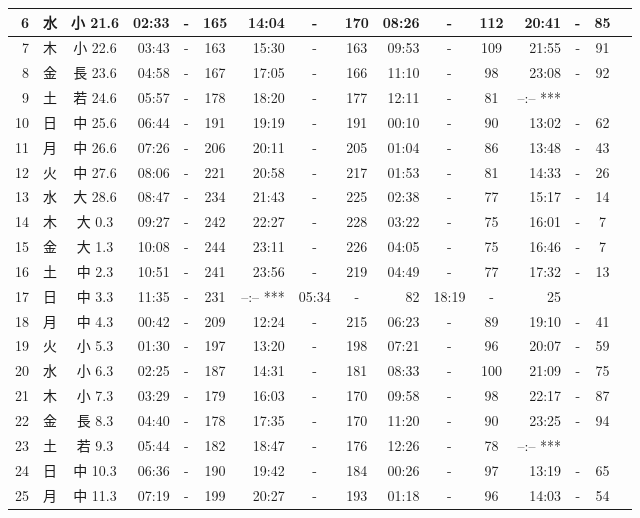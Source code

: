\documentclass[12pt.a4j]{jsarticle}
\begin{document}
\begin{center}
\begin{table}[ht]
\begin{tabular}{|rc|cr|ccrccr|ccrccr|}
\hline
 6 & 水 & 小 21.6 & 02:33 &-& 165 & 14:04 &-& 170 & 08:26 &-& 112 & 20:41 &-&  85 \\
\hline
 7 & 木 & 小 22.6 & 03:43 &-& 163 & 15:30 &-& 163 & 09:53 &-& 109 & 21:55 &-&  91 \\
\hline
 8 & 金 & 長 23.6 & 04:58 &-& 167 & 17:05 &-& 166 & 11:10 &-&  98 & 23:08 &-&  92 \\
\hline
 9 & 土 & 若 24.6 & 05:57 &-& 178 & 18:20 &-& 177 & 12:11 &-&  81 & --:--   *** \\
\hline
10 & 日 & 中 25.6 & 06:44 &-& 191 & 19:19 &-& 191 & 00:10 &-&  90 & 13:02 &-&  62 \\
\hline
11 & 月 & 中 26.6 & 07:26 &-& 206 & 20:11 &-& 205 & 01:04 &-&  86 & 13:48 &-&  43 \\
\hline
12 & 火 & 中 27.6 & 08:06 &-& 221 & 20:58 &-& 217 & 01:53 &-&  81 & 14:33 &-&  26 \\
\hline
13 & 水 & 大 28.6 & 08:47 &-& 234 & 21:43 &-& 225 & 02:38 &-&  77 & 15:17 &-&  14 \\
\hline
14 & 木 & 大  0.3 & 09:27 &-& 242 & 22:27 &-& 228 & 03:22 &-&  75 & 16:01 &-&   7 \\
\hline
15 & 金 & 大  1.3 & 10:08 &-& 244 & 23:11 &-& 226 & 04:05 &-&  75 & 16:46 &-&   7 \\
\hline
16 & 土 & 中  2.3 & 10:51 &-& 241 & 23:56 &-& 219 & 04:49 &-&  77 & 17:32 &-&  13 \\
\hline
17 & 日 & 中  3.3 & 11:35 &-& 231 & --:--   *** & 05:34 &-&  82 & 18:19 &-&  25 \\
\hline
18 & 月 & 中  4.3 & 00:42 &-& 209 & 12:24 &-& 215 & 06:23 &-&  89 & 19:10 &-&  41 \\
\hline
19 & 火 & 小  5.3 & 01:30 &-& 197 & 13:20 &-& 198 & 07:21 &-&  96 & 20:07 &-&  59 \\
\hline
20 & 水 & 小  6.3 & 02:25 &-& 187 & 14:31 &-& 181 & 08:33 &-& 100 & 21:09 &-&  75 \\
\hline
21 & 木 & 小  7.3 & 03:29 &-& 179 & 16:03 &-& 170 & 09:58 &-&  98 & 22:17 &-&  87 \\
\hline
22 & 金 & 長  8.3 & 04:40 &-& 178 & 17:35 &-& 170 & 11:20 &-&  90 & 23:25 &-&  94 \\
\hline
23 & 土 & 若  9.3 & 05:44 &-& 182 & 18:47 &-& 176 & 12:26 &-&  78 & --:--   *** \\
\hline
24 & 日 & 中 10.3 & 06:36 &-& 190 & 19:42 &-& 184 & 00:26 &-&  97 & 13:19 &-&  65 \\
\hline
25 & 月 & 中 11.3 & 07:19 &-& 199 & 20:27 &-& 193 & 01:18 &-&  96 & 14:03 &-&  54 \\

\end{tabular}
\end{table}
\end{center}
\end{document}
